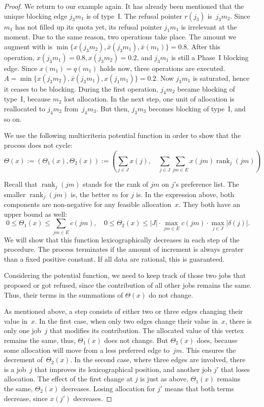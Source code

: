 \documentclass{llncs}
\DeclareMathOperator{\rank}{rank}
\begin{document}
\begin{proof}
We return to our example again. It has already been mentioned that the unique blocking edge $j_3m_1$ is of type~I. The refusal pointer $r(j_3)$ is~$j_3m_2$. Since $m_1$ has not filled up its quota yet, its refusal pointer $j_1m_1$ is irrelevant at the moment. Due to the same reason, two operations take place. The amount we augment with is $\min{\{x(j_3m_2), \bar{x}(j_3m_1), \bar{x}(m_1)\}} = 0.8$. After this operation, $x(j_3m_1) = 0.8, x(j_3m_2) = 0.2$, and $j_3m_1$ is still a Phase~I blocking edge. Since $x(m_1) = q(m_1)$ holds now, three operations are executed. $A = \min{\{x(j_3m_2), \bar{x}(j_3m_1), x(j_1m_1)\}} = 0.2$. Now $j_3m_1$ is saturated, hence it ceases to be blocking. During the first operation, $j_4m_2$ became blocking of type~I, because $m_2$ lost allocation. In the next step, one unit of allocation is reallocated to $j_4m_2$ from~$j_4m_3$. But then, $j_3m_3$ becomes blocking of type~I, and so on.

We use the following multicriteria potential function in order to show that the process does not cycle:
$$\Theta(x) := \left(\Theta_1(x),\Theta_2(x)\right) := \left(\sum_{j \in J}{x(j)}, \quad \sum_{j \in J}{\sum_{jm \in E}{x(jm) \rank_j(jm)}}\right)$$

Recall that $\rank_j(jm)$ stands for the rank of $jm$ on $j$'s preference list. The smaller $\rank_j(jm)$ is, the better $m$ for $j$ is. In the expression above, both components are non-negative for any feasible allocation~$x$. They both have an upper bound as well: $$0 \leq \Theta_1(x) \leq \sum_{jm \in E} {c(jm)}, \quad 0 \leq \Theta_2(x) \leq |J| \cdot \max_{jm \in E} {c(jm)} \cdot \max_{j \in J}{|\delta(j)|}.$$ We will show that this function lexicographically decreases in each step of the procedure. The process terminates if the amount of increment is always greater than a fixed positive constant. If all data are rational, this is guaranteed.

Considering the potential function, we need to keep track of those two jobs that proposed or got refused, since the contribution of all other jobs remains the same. Thus, their terms in the summations of $\Theta(x)$ do not change.

As mentioned above, a step consists of either two or three edges changing their value in~$x$. In the first case, when only two edges change their value in~$x$, there is only one job~$j$ that modifies its contribution. The allocated value of this vertex remains the same, thus, $\Theta_1(x)$ does not change. But $\Theta_2(x)$ does, because some allocation will move from a less preferred edge to~$jm$. This ensures the decrement of~$\Theta_2(x)$. In the second case, where three edges are involved, there is a job~$j$ that improves its lexicographical position, and another job $j'$ that loses allocation. The effect of the first change at $j$ is just as above, $\Theta_1(x)$ remains the same, $\Theta_2(x)$ decreases. Losing allocation for $j'$ means that both terms decrease, since $x(j')$ decreases.


\end{proof}
\end{document}
